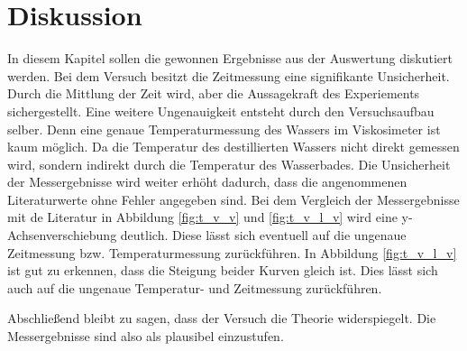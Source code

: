 \section{Diskussion}
In diesem Kapitel sollen die gewonnen Ergebnisse
aus der Auswertung diskutiert werden.
Bei dem Versuch besitzt die Zeitmessung eine
signifikante Unsicherheit. %
Durch die Mittlung der Zeit wird, aber die Aussagekraft des
Experiements sichergestellt.%
Eine weitere Ungenauigkeit entsteht durch den Versuchsaufbau selber. %
Denn eine genaue Temperaturmessung des Wassers im Viskosimeter
ist kaum möglich.
Da die Temperatur des destillierten Wassers nicht direkt gemessen wird,
sondern indirekt durch die Temperatur des Wasserbades. %
Die Unsicherheit der Messergebnisse wird weiter erhöht dadurch, dass
die angenommenen Literaturwerte ohne Fehler angegeben sind. %
Bei dem Vergleich der Messergebnisse mit de Literatur in Abbildung
\ref{fig:t_v_v} und \ref{fig:t_v_l_v} wird eine y-Achsenverschiebung deutlich.
Diese lässt sich eventuell auf die ungenaue Zeitmessung bzw. Temperaturmessung zurückführen.
In Abbildung \ref{fig:t_v_l_v} ist gut zu erkennen, dass die Steigung beider
Kurven gleich ist. %
Dies lässt sich auch auf die ungenaue Temperatur- und Zeitmessung zurückführen.%

Abschließend bleibt zu sagen, dass der Versuch die Theorie widerspiegelt. %
Die Messergebnisse sind also als plausibel einzustufen.
